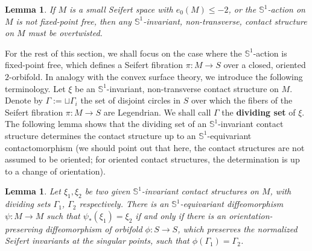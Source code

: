 \documentclass[11pt]{amsart}
\theoremstyle{plain}
\numberwithin{theorem}{section}
\newtheorem{lemma}[theorem]{Lemma}
\theoremstyle{definition}
\newcommand{\s}{{\mathbb S}}
\begin{document}
\begin{lemma} 
If $M$ is a small Seifert space with $e_0(M)\leq  -2$, or the $\s^1$-action on $M$ is not fixed-point free, then 
any $\s^1$-invariant, non-transverse, contact structure on $M$ must be overtwisted.
\end{lemma}

For the rest of this section, we shall focus on the case where the $\s^1$-action is fixed-point free, which defines a Seifert fibration $\pi: M\rightarrow S$ over a closed, oriented $2$-orbifold. In analogy with the convex surface theory, we introduce the following terminology. Let $\xi$ be an $\s^1$-invariant, non-transverse contact structure on $M$. Denote by $\Gamma:=\sqcup \Gamma_i $ the set of disjoint circles in $S$ over which the fibers of the Seifert fibration $\pi: M\rightarrow S$ are Legendrian. We shall call $\Gamma$ the {\bf dividing set} of $\xi$. The following lemma shows that the dividing set of an $\s^1$-invariant contact structure determines the contact structure up to an $\s^1$-equivariant contactomorphism (we should point out that here, the contact structures are not assumed to be oriented; for oriented contact structures, the determination is up to a change of orientation). 

\begin{lemma}
Let $\xi_1,\xi_2$ be two given $\s^1$-invariant contact structures on $M$, with dividing sets 
$\Gamma_1$, $\Gamma_2$ respectively. There is an $\s^1$-equivariant diffeomorphism 
$\psi: M\rightarrow M$ such that $\psi_\ast(\xi_1)=\xi_2$ if and only if there is an orientation-preserving diffeomorphism of orbifold $\phi: S\rightarrow S$, which preserves the normalized Seifert invariants at the singular points, such that $\phi(\Gamma_1)=\Gamma_2$. 
\end{lemma}
\end{document}
